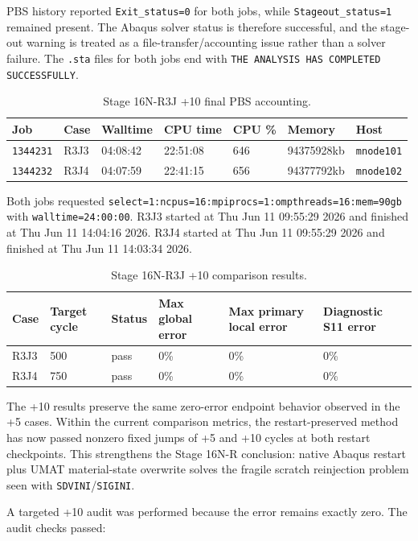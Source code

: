 \documentclass[11pt,a4paper]{article}
\newcommand{\code}[1]{\texttt{#1}}
\begin{document}
PBS history reported \code{Exit\_status=0} for both jobs, while \code{Stageout\_status=1} remained present. The Abaqus solver status is therefore successful, and the stage-out warning is treated as a file-transfer/accounting issue rather than a solver failure. The \code{.sta} files for both jobs end with \code{THE ANALYSIS HAS COMPLETED SUCCESSFULLY}.

\begin{table}[H]
\centering
\caption{Stage 16N-R3J +10 final PBS accounting.}
\begin{tabular}{lllllll}
\toprule
Job & Case & Walltime & CPU time & CPU \% & Memory & Host \\
\midrule
\code{1344231} & R3J3 & 04:08:42 & 22:51:08 & 646 & 94375928kb & \code{mnode101} \\
\code{1344232} & R3J4 & 04:07:59 & 22:41:15 & 656 & 94377792kb & \code{mnode102} \\
\bottomrule
\end{tabular}
\end{table}

Both jobs requested \code{select=1:ncpus=16:mpiprocs=1:ompthreads=16:mem=90gb} with \code{walltime=24:00:00}. R3J3 started at Thu Jun 11 09:55:29 2026 and finished at Thu Jun 11 14:04:16 2026. R3J4 started at Thu Jun 11 09:55:29 2026 and finished at Thu Jun 11 14:03:34 2026.

\begin{table}[H]
\centering
\caption{Stage 16N-R3J +10 comparison results.}
\begin{tabular}{llllll}
\toprule
Case & Target cycle & Status & Max global error & Max primary local error & Diagnostic S11 error \\
\midrule
R3J3 & 500 & pass & 0\% & 0\% & 0\% \\
R3J4 & 750 & pass & 0\% & 0\% & 0\% \\
\bottomrule
\end{tabular}
\end{table}

The +10 results preserve the same zero-error endpoint behavior observed in the +5 cases. Within the current comparison metrics, the restart-preserved method has now passed nonzero fixed jumps of +5 and +10 cycles at both restart checkpoints. This strengthens the Stage 16N-R conclusion: native Abaqus restart plus UMAT material-state overwrite solves the fragile scratch reinjection problem seen with \code{SDVINI}/\code{SIGINI}.

A targeted +10 audit was performed because the error remains exactly zero. The audit checks passed:
\end{document}
